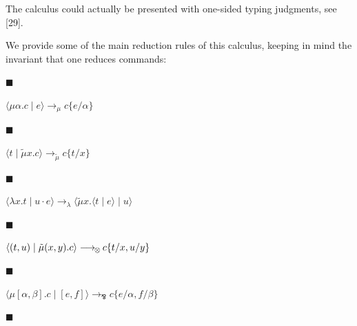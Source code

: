  
The calculus could actually be presented with one-sided typing judgments, see [29].\par
 
 
 
 
We provide some of the main reduction rules of this calculus, keeping in mind the invariant that one reduces commands:\par
  
\par\noindent  $\blacksquare$ 
 
$\langle\mu\alpha.c\mid e\rangle\longrightarrow_{\mu}c\{e/\alpha\}$\par
 
 
 
\par\noindent  $\blacksquare$ 
 
$\langle t\mid\tilde{\mu}x.c\rangle\longrightarrow_{\tilde{\mu}}c\{t/x\}$\par
 
 
 
\par\noindent  $\blacksquare$ 
 
$\langle\lambda x.t\mid u\cdot e\rangle\longrightarrow_{\lambda}\langle\tilde{\mu}x.\langle t\mid e\rangle\mid u\rangle$\par
 
 
 
\par\noindent  $\blacksquare$ 
 
$\langle(t,u)\mid\tilde{\mu}(x,y).c\rangle\longrightarrow_{\hskip-1.0pt\otimes\hskip-1.0pt}c\{t/x,u/y\}$\par
 
 
 
\par\noindent  $\blacksquare$ 
 
$\langle\mu[\alpha,\beta].c\mid[e,f]\rangle\longrightarrow_{\bindnasrepma}c\{e/\alpha,f/\beta\}$\par
 
 
 
\par\noindent  $\blacksquare$ 
 
